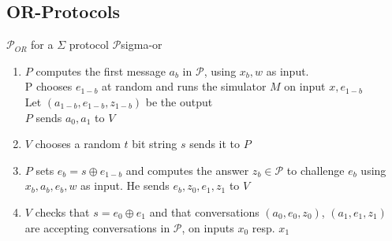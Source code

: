 \subsection{OR-Protocols}
\begin{protocol}{$\mathcal P_{OR}$ for a $\Sigma$ protocol $\mathcal P$}{sigma-or}
  \begin{enumerate}
   	\item $P$ computes the first message $a_b$ in $\mathcal P$, using $x_b,w$ as input. \\
  		    P chooses $e_{1-b}$ at random and runs the simulator $M$ on input $x,e_{1-b}$ \\
  		    Let $(a_{1-b},e_{1-b},z_{1-b})$ be the output \\
  		    $P$ sends $a_0, a_1$ to $V$
  	\item $V$ chooses a random $t$ bit string $s$ sends it to $P$
  	\item $P$ sets $e_b = s \oplus e_{1-b}$ and computes the answer $z_b \in \mathcal P$ to challenge $e_b$ using $x_b,a_b,e_b,w$ as input. He sends $e_b, z_0,e_1,z_1$ to $V$
  	\item $V$ checks that $s=e_0 \oplus e_1$ and that conversations $(a_0, e_0, z_0)$, $(a_1, e_1, z_1)$ are accepting conversations in $\mathcal P$, on inputs $x_0$ resp. $x_1$
  \end{enumerate}
\end{protocol}


